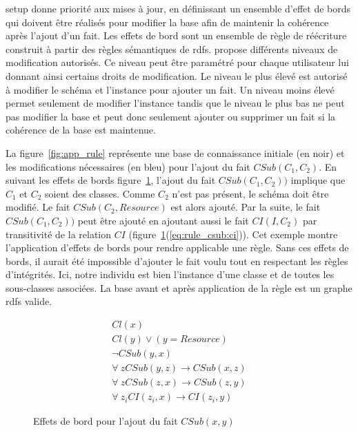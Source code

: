 \gls{setup} donne priorité aux mises à jour, en définissant un ensemble d'effet de bords qui doivent être réalisés pour modifier la base afin de maintenir la cohérence après l'ajout d'un fait.
Les effets de bord sont un ensemble de règle de réécriture construit à partir des règles sémantiques de \gls{rdfs}.
\cite{chabinUsingGraphGrammar2019} propose différents niveaux de modification autorisés.
Ce niveau peut être paramétré pour chaque utilisateur lui donnant ainsi certains droits de modification.
Le niveau le plus élevé est autorisé à modifier le schéma et l'instance pour ajouter un fait.
Un niveau moins élevé permet seulement de modifier l'instance tandis que le niveau le plus bas ne peut pas modifier la base et peut donc seulement ajouter ou supprimer un fait si la cohérence de la base est maintenue.

\begin{example}
    La figure~\ref{fig:app_rule} représente une base de connaissance initiale (en noir) et les modifications nécessaires (en bleu) pour l'ajout du fait $CSub(C_1, C_2)$.
    En suivant les effets de bords figure~\ref{eq:rule_csub}, l'ajout du fait $CSub(C_1, C_2))$ implique que $C_1$ et $C_2$ soient des classes.
    Comme $C_2$ n'est pas présent, le schéma doit être modifié.
    Le fait $CSub(C_2, Resource)$ est alors ajouté.
    Par la suite, le fait $CSub(C_1, C_2))$ peut être ajouté en ajoutant aussi le fait $CI(I, C_2)$ par transitivité de la relation $CI$ (figure~\ref{eq:rule_csub}(\ref{eq:rule_csub:ci})).
    Cet exemple montre l'application d'effets de bords pour rendre applicable une règle.
    Sans ces effets de bords, il aurait été impossible d'ajouter le fait voulu tout en respectant les règles d'intégrités.
    Ici, notre individu est bien l'instance d'une classe et de toutes les sous-classes associées.
    La base avant et après application de la règle est un graphe \gls{rdfs} valide.
\end{example}

\begin{figure}
    \begin{eqnarray*}
        Cl(x)\\
        Cl(y) \lor (y = Resource)\\
        \neg CSub(y, x)\\
        \forall~z CSub(y, z) \to CSub(x, z)\\
        \forall~z CSub(z, x) \to CSub(z, y)\\
        \forall~z_i CI(z_i, x) \to CI(z_i, y) \label{eq:rule_csub:ci}
    \end{eqnarray*}
    \caption{Effets de bord pour l'ajout du fait $CSub(x, y)$}
    \label{eq:rule_csub}
\end{figure}

